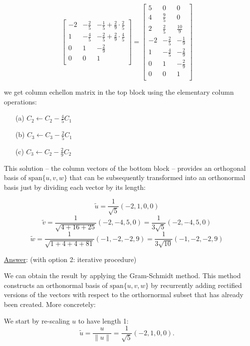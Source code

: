 \documentclass[]{book}
\theoremstyle{definition}
\newcommand\ans{\underline{Answer}: }
\begin{document}
\begin{enumerate}
\begin{enumerate}
\[{\begin{bmatrix}
-2 & -\frac{2}{5} & -\frac{1}{5} + \frac{2}{9}\cdot\frac{2}{5} \\
1 & -\frac{4}{5} & -\frac{2}{5} +\frac{2}{9}\cdot\frac{4}{5} \\
0 & 1 & -\frac{2}{9} \\
0 & 0 & 1 \\
\end{bmatrix}
}
=
{\begin{bmatrix}
5 & 0 & 0\\
4 & \frac{9}{5} & 0 \\
2 & \frac{2}{5} & \frac{10}{9} \\

-2 & -\frac{2}{5} & -\frac{1}{9} \\
1 & -\frac{4}{5} & -\frac{2}{9} \\
0 & 1 & -\frac{2}{9} \\
0 & 0 & 1 \\
\end{bmatrix}
}
\]

we get column echellon matrix in the top block using the elementary column operations: 
\begin{enumerate}
\item[(a)] $C_2 \leftarrow C_2 - \frac{4}{5}C_1$
\item[(b)] $C_3 \leftarrow C_3 - \frac{2}{5}C_1$
\item[(c)] $C_3 \leftarrow C_2 - \frac{2}{9}C_2$
\end{enumerate}

This solution -- the column vectors of the bottom block -- provides an orthogonal basis of $\textrm{span}\{u,v,w\}$  that can be subsequently transformed into an orthonormal basis just by dividing each vector by its length:

\[
\tilde{u} = \frac{1}{\sqrt{5}}(-2,1,0,0)
\]
\[
\tilde{v} = \frac{1}{\sqrt{4+16+25}}(-2,-4,5,0) = \frac{1}{3\sqrt{5}}(-2,-4,5,0)
\]
\[
\tilde{w} = \frac{1}{\sqrt{1+4+4+81}}(-1,-2,-2,9) = \frac{1}{3\sqrt{10}}(-1,-2,-2,9)
\]



\ans (with option 2: iterative procedure)

We can obtain the result by applying the Gram-Schmidt method. This method constructs an orthonormal basis of $\textrm{span}\{u,v,w\}$ by recurrently adding rectified versions of the vectors with respect to the orthornormal subset that has already been created. More concretely:

We start by re-scaling $u$ to have length 1:
\[
\tilde{u} = \frac{u}{\| u \|} = \frac{1}{\sqrt{5}}(-2,1,0,0).
\]



\end{enumerate}
\end{enumerate}
\end{document}
